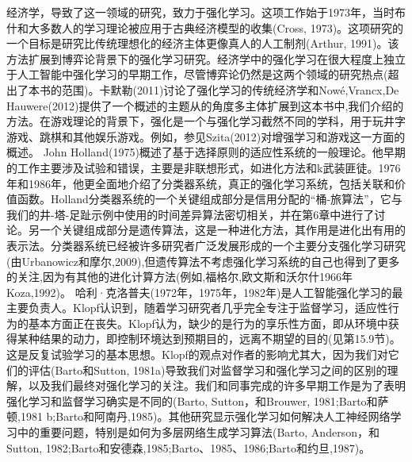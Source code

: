 经济学，导致了这一领域的研究，致力于强化学习。这项工作始于1973年，当时布什和大多数人的学习理论被应用于古典经济模型的收集(Cross, 1973)。这项研究的一个目标是研究比传统理想化的经济主体更像真人的人工制剂(Arthur, 1991)。该方法扩展到博弈论背景下的强化学习研究。经济学中的强化学习在很大程度上独立于人工智能中强化学习的早期工作，尽管博弈论仍然是这两个领域的研究热点(超出了本书的范围)。卡默勒(2011)讨论了强化学习的传统经济学和Nowé,Vrancx,De Hauwere(2012)提供了一个概述的主题从的角度多主体扩展到这本书中,我们介绍的方法。在游戏理论的背景下，强化是一个与强化学习截然不同的学科，用于玩井字游戏、跳棋和其他娱乐游戏。例如，参见Szita(2012)对增强学习和游戏这一方面的概述。
John Holland(1975)概述了基于选择原则的适应性系统的一般理论。他早期的工作主要涉及试验和错误，主要是非联想形式，如进化方法和k武装匪徒。1976年和1986年，他更全面地介绍了分类器系统，真正的强化学习系统，包括关联和价值函数。Holland分类器系统的一个关键组成部分是信用分配的“桶-旅算法”，它与我们的井-塔-足趾示例中使用的时间差异算法密切相关，并在第6章中进行了讨论。另一个关键组成部分是遗传算法，这是一种进化方法，其作用是进化出有用的表示法。分类器系统已经被许多研究者广泛发展形成的一个主要分支强化学习研究(由Urbanowicz和摩尔,2009),但遗传算法不考虑强化学习系统的自己也得到了更多的关注,因为有其他的进化计算方法(例如,福格尔,欧文斯和沃尔什1966年Koza,1992)。
哈利·克洛普夫(1972年，1975年，1982年)是人工智能强化学习的最主要负责人。Klopf认识到，随着学习研究者几乎完全专注于监督学习，适应性行为的基本方面正在丧失。Klopf认为，缺少的是行为的享乐性方面，即从环境中获得某种结果的动力，即控制环境达到预期目的，远离不期望的目的(见第15.9节)。这是反复试验学习的基本思想。Klopf的观点对作者的影响尤其大，因为我们对它们的评估(Barto和Sutton, 1981a)导致我们对监督学习和强化学习之间的区别的理解，以及我们最终对强化学习的关注。我们和同事完成的许多早期工作是为了表明强化学习和监督学习确实是不同的(Barto, Sutton，和Brouwer, 1981;Barto和萨顿,1981 b;Barto和阿南丹,1985)。其他研究显示强化学习如何解决人工神经网络学习中的重要问题，特别是如何为多层网络生成学习算法(Barto, Anderson，和Sutton, 1982;Barto和安德森,1985;Barto、1985、1986;Barto和约旦,1987)。

